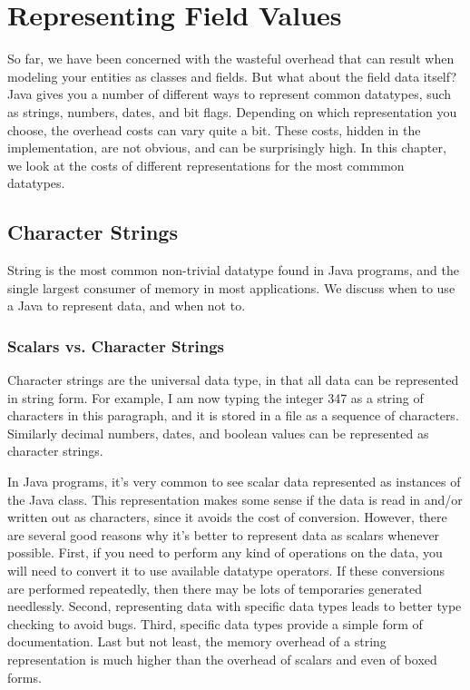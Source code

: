 \chapter{Representing Field Values}
\label{chapter:representing-values}

So far, we have been concerned with the wasteful overhead that can result when
modeling your entities as classes and fields. But what about the field data itself?
Java gives you a number of different ways to represent common datatypes, such
as strings, numbers, dates, and bit flags. Depending on which
representation you choose, the overhead costs can vary quite a bit. 
These costs, hidden in the implementation, are not obvious, and can be
surprisingly high.
In this chapter, we look at the costs of different representations for the most 
commmon datatypes.

\section{Character Strings}
String is the most common non-trivial datatype found in Java programs, and the single largest 
consumer of memory in most applications. We
discuss when to use a Java  to represent data, and when not to.

\subsection{Scalars vs. Character Strings}
Character strings are the universal data type, in that all data can be
represented in string form.  For example, I am now typing the integer 347 as a
string of characters in this paragraph, and it is stored in a file as a sequence
of characters. Similarly decimal numbers, dates, and boolean values can be
represented as character strings.
 
In Java programs, it's very common to see scalar data represented as instances
of the Java  class. This representation makes some sense if the
data is read in and/or written out as characters, since it avoids the
cost of conversion. However, there are several good reasons why it's better
to represent data as scalars whenever possible. First, if you need to perform
any kind of operations on the data, you will need to convert it to use
available datatype operators. If these conversions are performed
repeatedly, then there may be lots of temporaries generated needlessly.  Second,
representing data with specific data types leads to better type checking to avoid bugs. 
Third, specific data types provide a simple form of documentation.
Last but not least, the memory overhead of a string representation is much
higher than the overhead of scalars and even of boxed forms.

